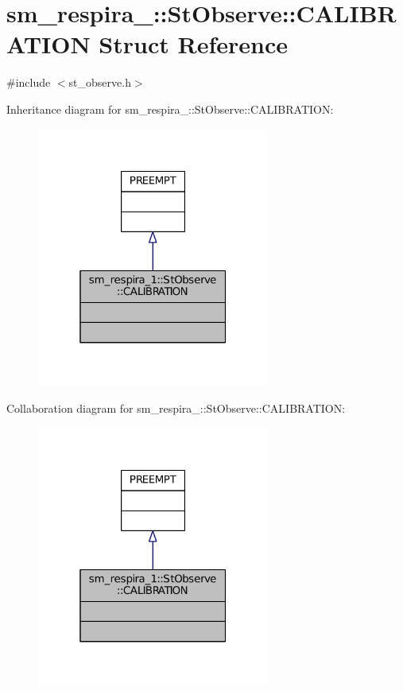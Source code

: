 \hypertarget{structsm__respira__1_1_1StObserve_1_1CALIBRATION}{}\section{sm\+\_\+respira\+\_\+:\+:St\+Observe\+:\+:C\+A\+L\+I\+B\+R\+A\+T\+I\+ON Struct Reference}
\label{structsm__respira__1_1_1StObserve_1_1CALIBRATION}


{\ttfamily \#include $<$st\+\_\+observe.\+h$>$}



Inheritance diagram for sm\+\_\+respira\+\_\+:\+:St\+Observe\+:\+:C\+A\+L\+I\+B\+R\+A\+T\+I\+ON\+:
\nopagebreak
\begin{figure}[H]
\begin{center}
\leavevmode
\includegraphics[width=217pt]{structsm__respira__1_1_1StObserve_1_1CALIBRATION__inherit__graph}
\end{center}
\end{figure}


Collaboration diagram for sm\+\_\+respira\+\_\+:\+:St\+Observe\+:\+:C\+A\+L\+I\+B\+R\+A\+T\+I\+ON\+:
\nopagebreak
\begin{figure}[H]
\begin{center}
\leavevmode
\includegraphics[width=217pt]{structsm__respira__1_1_1StObserve_1_1CALIBRATION__coll__graph}
\end{center}
\end{figure}


